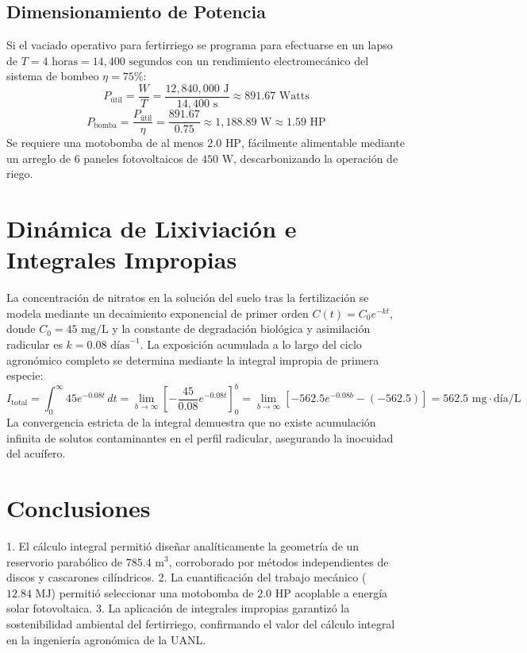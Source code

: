 \subsection{Dimensionamiento de Potencia}
Si el vaciado operativo para fertirriego se programa para efectuarse en un lapso de $T = 4\text{ horas} = 14,400\text{ segundos}$ con un rendimiento electromecánico del sistema de bombeo $\eta = 75\%$:
\begin{equation}
    P_{\text{útil}} = \frac{W}{T} = \frac{12,840,000\text{ J}}{14,400\text{ s}} \approx 891.67\text{ Watts}
\end{equation}
\begin{equation}
    P_{\text{bomba}} = \frac{P_{\text{útil}}}{\eta} = \frac{891.67}{0.75} \approx 1,188.89\text{ W} \approx 1.59\text{ HP}
\end{equation}
Se requiere una motobomba de al menos $2.0\text{ HP}$, fácilmente alimentable mediante un arreglo de 6 paneles fotovoltaicos de $450\text{ W}$, descarbonizando la operación de riego.

\section{Dinámica de Lixiviación e Integrales Impropias}
La concentración de nitratos en la solución del suelo tras la fertilización se modela mediante un decaimiento exponencial de primer orden $C(t) = C_0 e^{-kt}$, donde $C_0 = 45\text{ mg/L}$ y la constante de degradación biológica y asimilación radicular es $k = 0.08\text{ días}^{-1}$.
La exposición acumulada a lo largo del ciclo agronómico completo se determina mediante la integral impropia de primera especie:
\begin{equation}
    I_{\text{total}} = \int_{0}^{\infty} 45 e^{-0.08 t}\,dt = \lim_{b \to \infty} \left[ -\frac{45}{0.08} e^{-0.08 t} \right]_{0}^{b} = \lim_{b \to \infty} \left[ -562.5 e^{-0.08 b} - (-562.5) \right] = 562.5\text{ mg}\cdot\text{día/L}
\end{equation}
La convergencia estricta de la integral demuestra que no existe acumulación infinita de solutos contaminantes en el perfil radicular, asegurando la inocuidad del acuífero.

\section{Conclusiones}
1. El cálculo integral permitió diseñar analíticamente la geometría de un reservorio parabólico de $785.4\text{ m}^3$, corroborado por métodos independientes de discos y cascarones cilíndricos.
2. La cuantificación del trabajo mecánico ($12.84\text{ MJ}$) permitió seleccionar una motobomba de $2.0\text{ HP}$ acoplable a energía solar fotovoltaica.
3. La aplicación de integrales impropias garantizó la sostenibilidad ambiental del fertirriego, confirmando el valor del cálculo integral en la ingeniería agronómica de la UANL.

